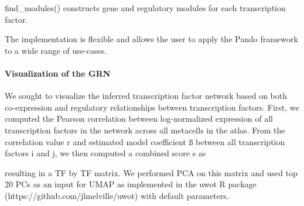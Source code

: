 find\_modules() constructs gene and regulatory modules for each transcription factor.
 
The implementation is flexible and allows the user to apply the Pando framework to a wide range of use-cases.
 
\paragraph{Visualization of the GRN}
We sought to visualize the inferred transcription factor network based on both co-expression and regulatory relationships between transcription factors. First, we computed the Pearson correlation between log-normalized expression of all transcription factors in the network across all metacells in the atlas. From the correlation value r and estimated model coefficient ß between all transcription factors i and j, we then computed a combined score s as
 
            
 
resulting in a TF by TF matrix. We performed PCA on this matrix and used top 20 PCs as an input for UMAP as implemented in the uwot R package (https://github.com/jlmelville/uwot) with default parameters.
 
